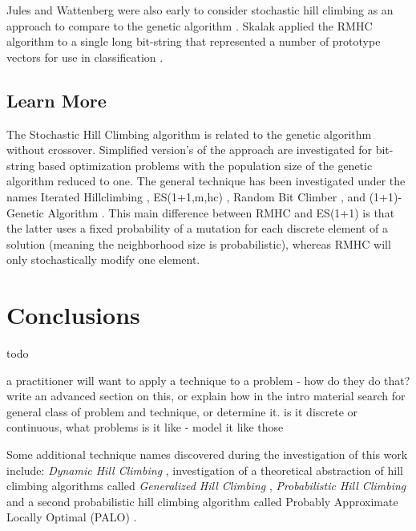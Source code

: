 \documentclass[a4paper, 11pt]{article}
\begin{document}
Jules and Wattenberg were also early to consider stochastic hill climbing as an approach to compare to the genetic algorithm \cite{Juels1994}.
Skalak applied the RMHC algorithm to a single long bit-string that represented a number of prototype vectors for use in classification \cite{Skalak1994}.


% 
% 
\subsection{Learn More}
The Stochastic Hill Climbing algorithm is related to the genetic algorithm without crossover. Simplified version's of the approach are investigated for bit-string based optimization problems with the population size of the genetic algorithm reduced to one. The general technique has been investigated under the names Iterated Hillclimbing \cite{Muhlenbein1991}, ES(1+1,m,hc) \cite{Muhlenbein1992}, Random Bit Climber \cite{Davis1991}, and (1+1)-Genetic Algorithm \cite{Back1993}. This main difference between RMHC and ES(1+1) is that the latter uses a fixed probability of a mutation for each discrete element of a solution (meaning the neighborhood size is probabilistic), whereas RMHC will only stochastically modify one element.



% 
% 
\section{Conclusions}
\label{sec:conclusions}
todo

a practitioner will want to apply a technique to a problem - how do they do that?
write an advanced section on this, or explain how in the intro material
search for general class of problem and technique, or determine it. is it discrete or continuous, what problems is it like - model it like those

Some additional technique names discovered during the investigation of this work include: \emph{Dynamic Hill Climbing} \cite{Yuret1993}, investigation of a theoretical abstraction of hill climbing algorithms called \emph{Generalized Hill Climbing} \cite{Johnson2002, Sullivan2001}, \emph{Probabilistic Hill Climbing} \cite{Romeo1984} and a second probabilistic hill climbing algorithm called Probably Approximate Locally Optimal (PALO) \cite{Cohen1994}.
\end{document}
